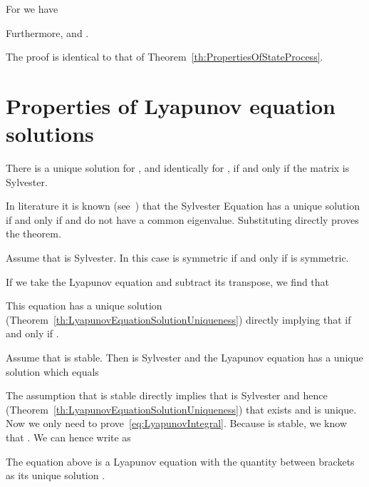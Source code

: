 \documentclass[twocolumn]{autart}
\begin{document}
\begin{thm}\label{th:MultipleTimeStateProcess}
For  we have

Furthermore,  and .
\end{thm}
\begin{pf}
The proof is identical to that of Theorem~\ref{th:PropertiesOfStateProcess}.
\end{pf}

\section{Properties of Lyapunov equation solutions} \label{s:LyapunovTheorems}

\begin{thm}\label{th:LyapunovEquationSolutionUniqueness}
There is a unique solution for , and identically for , if and only if the matrix  is Sylvester.
\end{thm}
\begin{pf}
In literature it is known (see~\cite{SylvesterEquation}) that the Sylvester Equation  has a unique solution if and only if  and  do not have a common eigenvalue. Substituting  directly proves the theorem.
\end{pf}

\begin{thm}\label{th:SymmetricLyapunovSolution}
Assume that  is Sylvester. In this case  is symmetric if and only if  is symmetric.
\end{thm}
\begin{pf}
If we take the Lyapunov equation  and subtract its transpose, we find that

This equation has a unique solution (Theorem~\ref{th:LyapunovEquationSolutionUniqueness}) directly implying that  if and only if .
\end{pf}

\begin{thm}\label{th:InfiniteIntegralToLyapunov}
Assume that  is stable. Then  is Sylvester and the Lyapunov equation  has a unique solution  which equals

\end{thm}
\begin{pf}
The assumption that  is stable directly implies that  is Sylvester and hence (Theorem~\ref{th:LyapunovEquationSolutionUniqueness}) that  exists and is unique. Now we only need to prove~\eqref{eq:LyapunovIntegral}. Because  is stable, we know that . We can hence write  as

The equation above is a Lyapunov equation with the quantity between brackets as its unique solution .
\end{pf}
\end{document}
